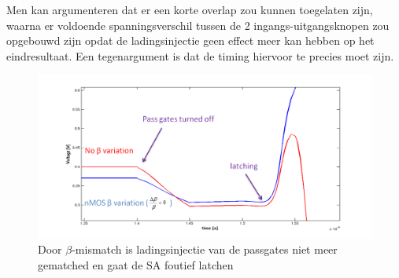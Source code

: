 Men kan argumenteren dat er een korte overlap zou kunnen toegelaten zijn, waarna er voldoende spanningsverschil tussen de 2 ingangs-uitgangsknopen zou opgebouwd zijn opdat de ladingsinjectie geen effect meer kan hebben op het eindresultaat. Een tegenargument is dat de timing hiervoor te precies moet zijn.
\begin{figure}
  \centering
  \includegraphics[scale=0.4]{../fig/hfdstk-sensamp-chargeinjectionmismatch.png}
  \caption[Foutief latchen door $\beta$-mismatch]{Door $\beta$-mismatch is ladingsinjectie van de passgates niet meer gematched en gaat de SA foutief latchen}
  \label{fig:chargeinjectionmismatch}
\end{figure}

